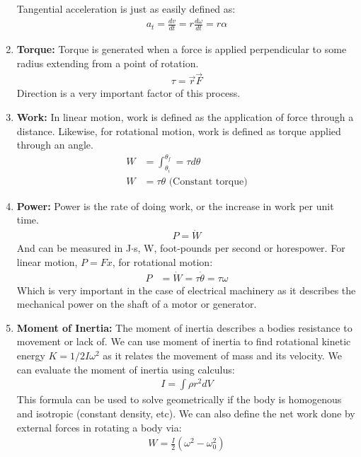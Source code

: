 \documentclass{book}
\begin{document}
\begin{enumerate}
	Tangential acceleration is just as easily defined as:
	\begin{align*}
		a_t = \frac{dv}{dt} = r \frac{d\omega}{dt} = r \alpha
	\end{align*}
	\item \textbf{Torque:} Torque is generated when a force is applied perpendicular to some radius extending from a point of rotation. 
	\begin{align*}
		\tau = \vec{r}\vec{F} 
	\end{align*}
	Direction is a very important factor of this process.
	\item \textbf{Work:} In linear motion, work is defined as the application of force through a distance. Likewise, for rotational motion, work is defined as torque applied through an angle.
	\begin{align*}
		W &= \int_{\theta_i}^{\theta_f} = \tau d \theta \\
		W &= \tau \theta \text{ (Constant torque)}
	\end{align*}
	\item \textbf{Power:} Power is the rate of doing work, or the increase in work per unit time.
	\begin{align*}
		P = \dot{W}
	\end{align*}
	And can be measured in J$\cdot$s, W, foot-pounds per second or horespower. For linear motion, $P = F \dot{x} $, for rotational motion:
	\begin{align*}
		P &= \dot{W} = \tau \dot{\theta} = \tau \omega
	\end{align*}
	Which is very important in the case of electrical machinery as it describes the mechanical power on the shaft of a motor or generator.
	\item \textbf{Moment of Inertia:} The moment of inertia describes a bodies resistance to movement or lack of.  We can  use moment of inertia to find rotational kinetic energy $K = 1/2 I \omega^2$ as it relates the movement of mass and its velocity. We can evaluate the moment of inertia using calculus:
	\begin{align*}
		I = \int \rho r^2 dV
	\end{align*}
	This formula can be used to solve geometrically if the body is homogenous and isotropic (constant density, etc). We can also define the net work done by external forces in rotating a body via:
	\begin{align*}
		W = \frac{I}{2}(\omega^2 - \omega_0 ^2)
	\end{align*}
\end{enumerate}
\end{document}
